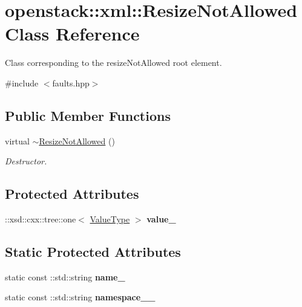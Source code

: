 \hypertarget{classopenstack_1_1xml_1_1ResizeNotAllowed}{
\section{openstack::xml::ResizeNotAllowed Class Reference}
\label{classopenstack_1_1xml_1_1ResizeNotAllowed}
}


Class corresponding to the resizeNotAllowed root element.  




{\ttfamily \#include $<$faults.hpp$>$}

\subsection*{Public Member Functions}
\begin{DoxyCompactItemize}
\item 
\hypertarget{classopenstack_1_1xml_1_1ResizeNotAllowed_a62c1c952bed59cb85852da36ddd964db}{
virtual \hyperlink{classopenstack_1_1xml_1_1ResizeNotAllowed_a62c1c952bed59cb85852da36ddd964db}{$\sim$ResizeNotAllowed} ()}
\label{classopenstack_1_1xml_1_1ResizeNotAllowed_a62c1c952bed59cb85852da36ddd964db}

\begin{DoxyCompactList}\small\item\em Destructor. \item\end{DoxyCompactList}\end{DoxyCompactItemize}
\subsection*{Protected Attributes}
\begin{DoxyCompactItemize}
\item 
\hypertarget{classopenstack_1_1xml_1_1ResizeNotAllowed_a2ce8cd40984a920007b5c24b6c8074d0}{
::xsd::cxx::tree::one$<$ \hyperlink{classopenstack_1_1xml_1_1ResizeNotAllowedAPIFault}{ValueType} $>$ {\bfseries value\_\-}}
\label{classopenstack_1_1xml_1_1ResizeNotAllowed_a2ce8cd40984a920007b5c24b6c8074d0}

\end{DoxyCompactItemize}
\subsection*{Static Protected Attributes}
\begin{DoxyCompactItemize}
\item 
\hypertarget{classopenstack_1_1xml_1_1ResizeNotAllowed_a3f23cd09d388155c2c2e0e5b20445798}{
static const ::std::string {\bfseries name\_\-}}
\label{classopenstack_1_1xml_1_1ResizeNotAllowed_a3f23cd09d388155c2c2e0e5b20445798}

\item 
\hypertarget{classopenstack_1_1xml_1_1ResizeNotAllowed_a64b1c5c8843c82cfdb21e77edb7c9f02}{
static const ::std::string {\bfseries namespace\_\-\_\-}}
\label{classopenstack_1_1xml_1_1ResizeNotAllowed_a64b1c5c8843c82cfdb21e77edb7c9f02}

\end{DoxyCompactItemize}
